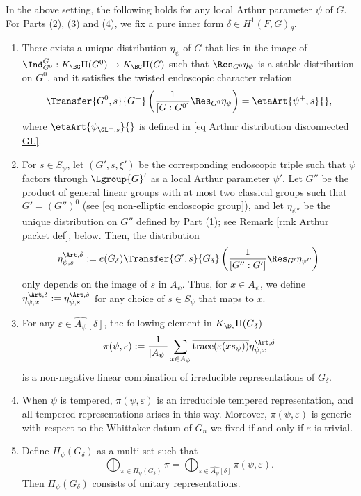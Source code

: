 \documentclass[11pt,letterpaper]{amsart}
\numberwithin{equation}{section}
\begin{document}
\begin{conjecture}\label{conj: Arthur}
   In the above setting, the following holds for any local Arthur parameter $\psi$ of $G$. For Parts (2), (3) and (4), we fix a pure inner form $\delta \in H^1(F,G)_{\theta}$.
    \begin{enumerate}
        \item There exists a unique distribution ${\eta}_{\psi}$ of $G$ that lies in the image of $\Ind_{G^0}^G: K_{\BC} \Pi(G^0) \to K_{\BC}\Pi(G)$        
        such that $ 
\Res_{G^0}\eta_{\psi}$ is a stable distribution on $G^0$, and it satisfies the twisted endoscopic character relation
        \[\Transfer{G^0,s}{G^+}\left( {\frac{1}{[G:G^0]}} \Res_{G^0}\eta_{\psi} \right) =  \etaArt{\psi^+,s}{}, \]
        where $\etaArt{\psi_{\GL^+,s}}{}$ is defined in \eqref{eq Arthur distribution disconnected GL}.
        \item For $s \in S_{\psi}$, let $(G',s,\xi')$ be the corresponding endoscopic triple such that $ \psi$ factors through $\Lgroup{G}'$ as a local Arthur parameter $\psi'$. Let $G''$ be the product of general linear groups with at most two classical groups such that $G'= (G'')^{0}$ (see \eqref{eq non-elliptic endoscopic group}), and let $\eta_{\psi''}$ be the unique distribution on $G''$ defined by Part (1); see Remark \ref{rmk Arthur packet def}, below.
        Then, the distribution
          \begin{align*}
            \eta_{\psi,s}^{\Art,\delta}:= e(G_\delta) \Transfer{G',s}{G_{\delta}} \left( \frac{1}{[G'':G']} \Res_{G'} \eta_{\psi''}\right)
        \end{align*}
        only depends on the image of $s$ in $A_{\psi}$. Thus, for $x \in A_{\psi}$, we define $\eta_{\psi,x}^{\Art,\delta}:= \eta_{\psi,s}^{\Art,\delta}$ for any choice of $s\in S_{\psi}$ that maps to $x$.
    
        \item For any $\varepsilon \in \widehat{A_{\psi}}[\delta]$, the following element in $K_{\BC}\Pi(G_{\delta})$
        \[ \pi(\psi,\varepsilon):= \frac{1}{|A_{\psi}|} \sum_{x \in A_{\psi}} \overline{\mathrm{trace}(\varepsilon(x s_{\psi}))} \eta_{\psi,x}^{\Art, \delta}\]
        is a non-negative linear combination of irreducible representations of $G_{\delta}$. 
        \item When $\psi$ is tempered, $\pi(\psi,\varepsilon)$ is an irreducible tempered representation, and all tempered representations arises in this way. Moreover, $\pi(\psi, \varepsilon)$ is generic with respect to the Whittaker datum of $G_n$ we fixed if and only if $\varepsilon$ is trivial.
        \item Define $\Pi_{\psi}(G_{\delta})$ as a multi-set such that
        \[ \bigoplus_{\pi \in \Pi_{\psi}(G_{\delta})} \pi= \bigoplus_{\varepsilon \in \widehat{A_{\psi}}[\delta]} \pi(\psi,\varepsilon).\]
        Then $\Pi_{\psi}(G_{\delta})$ consists of unitary representations.
    \end{enumerate}
\end{conjecture}
\end{document}
